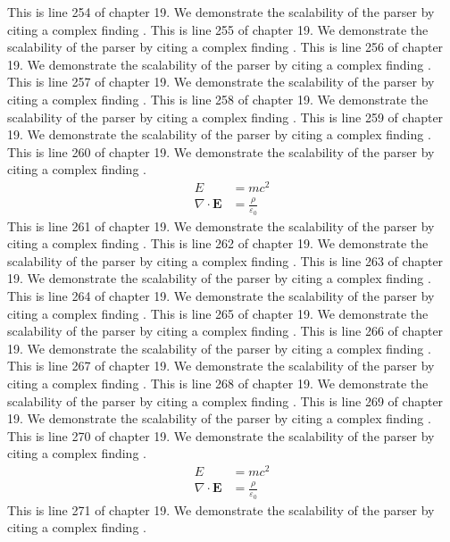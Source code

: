 This is line 254 of chapter 19. We demonstrate the scalability of the parser by citing a complex finding \cite{ref19_254}.
This is line 255 of chapter 19. We demonstrate the scalability of the parser by citing a complex finding \cite{ref19_255}.
This is line 256 of chapter 19. We demonstrate the scalability of the parser by citing a complex finding \cite{ref19_256}.
This is line 257 of chapter 19. We demonstrate the scalability of the parser by citing a complex finding \cite{ref19_257}.
This is line 258 of chapter 19. We demonstrate the scalability of the parser by citing a complex finding \cite{ref19_258}.
This is line 259 of chapter 19. We demonstrate the scalability of the parser by citing a complex finding \cite{ref19_259}.
This is line 260 of chapter 19. We demonstrate the scalability of the parser by citing a complex finding \cite{ref19_260}.
\begin{align*}
  E &= mc^2 \\
  \nabla \cdot \mathbf{E} &= \frac{\rho}{\varepsilon_0}
\end{align*}
This is line 261 of chapter 19. We demonstrate the scalability of the parser by citing a complex finding \cite{ref19_261}.
This is line 262 of chapter 19. We demonstrate the scalability of the parser by citing a complex finding \cite{ref19_262}.
This is line 263 of chapter 19. We demonstrate the scalability of the parser by citing a complex finding \cite{ref19_263}.
This is line 264 of chapter 19. We demonstrate the scalability of the parser by citing a complex finding \cite{ref19_264}.
This is line 265 of chapter 19. We demonstrate the scalability of the parser by citing a complex finding \cite{ref19_265}.
This is line 266 of chapter 19. We demonstrate the scalability of the parser by citing a complex finding \cite{ref19_266}.
This is line 267 of chapter 19. We demonstrate the scalability of the parser by citing a complex finding \cite{ref19_267}.
This is line 268 of chapter 19. We demonstrate the scalability of the parser by citing a complex finding \cite{ref19_268}.
This is line 269 of chapter 19. We demonstrate the scalability of the parser by citing a complex finding \cite{ref19_269}.
This is line 270 of chapter 19. We demonstrate the scalability of the parser by citing a complex finding \cite{ref19_270}.
\begin{align*}
  E &= mc^2 \\
  \nabla \cdot \mathbf{E} &= \frac{\rho}{\varepsilon_0}
\end{align*}
This is line 271 of chapter 19. We demonstrate the scalability of the parser by citing a complex finding \cite{ref19_271}.
